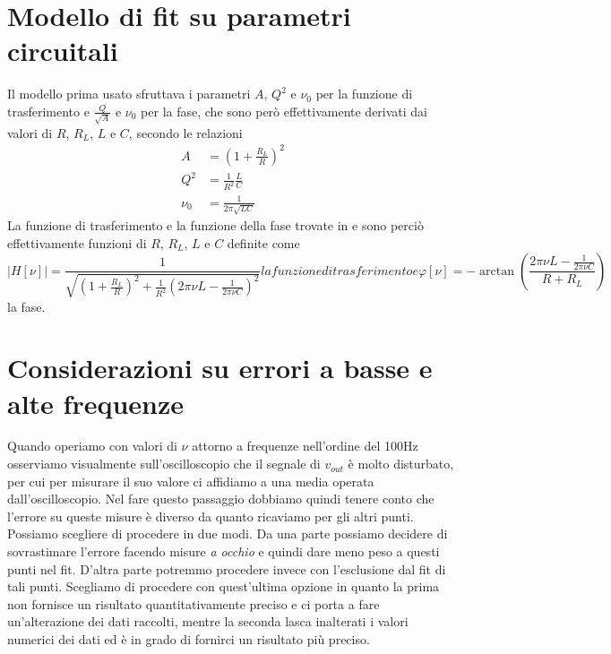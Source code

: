 \documentclass[
    rmp,
    floatfix,
    reprint, 
    superscriptaddress, 
    altaffilletter, 
    amsmath, 
    amssymb, 
    a4paper]{revtex4-2}
\begin{document}
\section*{Modello di fit su parametri circuitali}
Il modello prima usato sfruttava i parametri $A$, $Q^2$ e $\nu_0$ per la funzione di trasferimento e $\frac{Q}{\sqrt{A}}$ e $\nu_0$ per la fase, che sono però effettivamente derivati dai valori di $R$, $R_L$, $L$ e $C$, secondo le relazioni 
\begin{align}
    A &= \left(1+\frac{R_L}{R}\right)^2 \\
    Q^2 &= \frac{1}{R^2}\frac{L}{C} \\
    \nu_0 &= \frac{1}{2\pi\sqrt{LC}} 
\end{align}
La funzione di trasferimento e la funzione della fase trovate in  e  sono perciò effettivamente funzioni di $R$, $R_L$, $L$ e $C$ definite come
\begin{subequations}
    \begin{equation}
        \big|H[\nu]\big| = \frac{1}{\sqrt{\left(1+\frac{R_L}{R}\right)^2 + \frac{1}{R^2}\left(2\pi\nu L - \frac{1}{2\pi\nu C}\right)^2}}
    \end{equation}
    la funzione di trasferimento e 
    \begin{equation}
        \varphi[\nu] = -\arctan(\frac{2\pi\nu L - \frac{1}{2\pi\nu C}}{R + R_L})
    \end{equation}
\end{subequations}
la fase. 


\section*{Considerazioni su errori a basse e alte frequenze}
Quando operiamo con valori di $\nu$ attorno a frequenze nell'ordine del 100Hz osserviamo visualmente sull'oscilloscopio che il segnale di $v_{out}$ è molto disturbato, per cui per misurare il suo valore ci affidiamo a una media operata dall'oscilloscopio. Nel fare questo passaggio dobbiamo quindi tenere conto che l'errore su queste misure è diverso da quanto ricaviamo per gli altri punti. Possiamo scegliere di procedere in due modi. Da una parte possiamo decidere di sovrastimare l'errore facendo misure \textit{a occhio} e quindi dare meno peso a questi punti nel fit. D'altra parte potremmo procedere invece con l'esclusione dal fit di tali punti. Scegliamo di procedere con quest'ultima opzione in quanto la prima non fornisce un risultato quantitativamente preciso e ci porta a fare un'alterazione dei dati raccolti, mentre la seconda lasca inalterati i valori numerici dei dati ed è in grado di fornirci un risultato più preciso. 
\end{document}
